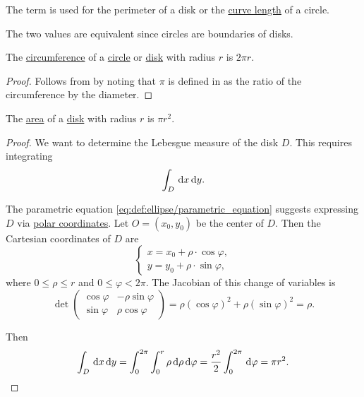 \begin{definition}\label{def:circumference}
  The term  is used for the perimeter of a disk or the \hyperref[def:parametric_curve_length]{curve length} of a circle.
\end{definition}
\begin{defproof}
  The two values are equivalent since circles are boundaries of disks.
\end{defproof}

\begin{proposition}\label{thm:circumference}
  The \hyperref[def:circumference]{circumference} of a \hyperref[def:circle]{circle} or \hyperref[def:disk]{disk} with radius \( r \) is \( 2\pi r \).
\end{proposition}
\begin{proof}
  Follows from  by noting that \( \pi \) is defined in  as the ratio of the circumference by the diameter.
\end{proof}

\begin{proposition}\label{thm:area_of_circle}
  The \hyperref[def:area]{area} of a \hyperref[def:disk]{disk} with radius \( r \) is \( \pi r^2 \).
\end{proposition}
\begin{proof}
  We want to determine the Lebesgue measure of the disk \( D \). This requires integrating
  \begin{equation*}
    \int_D \dl x \dl y.
  \end{equation*}

  The parametric equation \eqref{eq:def:ellipse/parametric_equation} suggests expressing \( D \) via \hyperref[rem:polar_coordinate_system]{polar coordinates}. Let \( O = (x_0, y_0) \) be the center of \( D \). Then the Cartesian coordinates of \( D \) are
  \begin{equation*}
    \begin{cases}
      x = x_0 + \rho \cdot \cos \varphi, \\
      y = y_0 + \rho \cdot \sin \varphi,
    \end{cases}
  \end{equation*}
  where \( 0 \leq \rho \leq r \) and \( 0 \leq \varphi < 2\pi \). The Jacobian of this change of variables is
  \begin{equation*}
    \det
    \begin{pmatrix}
      \cos \varphi & -\rho \sin \varphi \\
      \sin \varphi & \rho \cos \varphi
    \end{pmatrix}
    =
    \rho (\cos \varphi)^2 + \rho (\sin \varphi)^2
    =
    \rho.
  \end{equation*}

  Then
  \begin{equation*}
    \int_D \dl x \dl y
    =
    \int_0^{2\pi} \int_0^r \rho \dl \rho \dl \varphi
    =
    \frac {r^2} 2 \int_0^{2\pi} \dl \varphi
    =
    \pi r^2.
  \end{equation*}
\end{proof}
